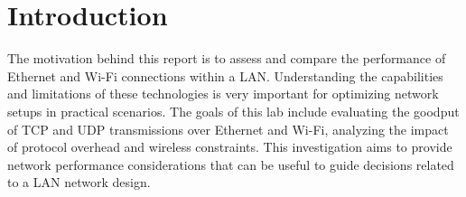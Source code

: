 \section{Introduction}
\label{sec:intro}
 The motivation behind this report is to assess and compare the performance of Ethernet and Wi-Fi connections within a LAN. Understanding the capabilities and limitations of these technologies is very important for optimizing network setups in practical scenarios. The goals of this lab include evaluating the goodput of TCP and UDP transmissions over Ethernet and Wi-Fi, analyzing the impact of protocol overhead and wireless constraints. This investigation aims to provide network performance considerations that can be useful to guide decisions related to a LAN network design.
